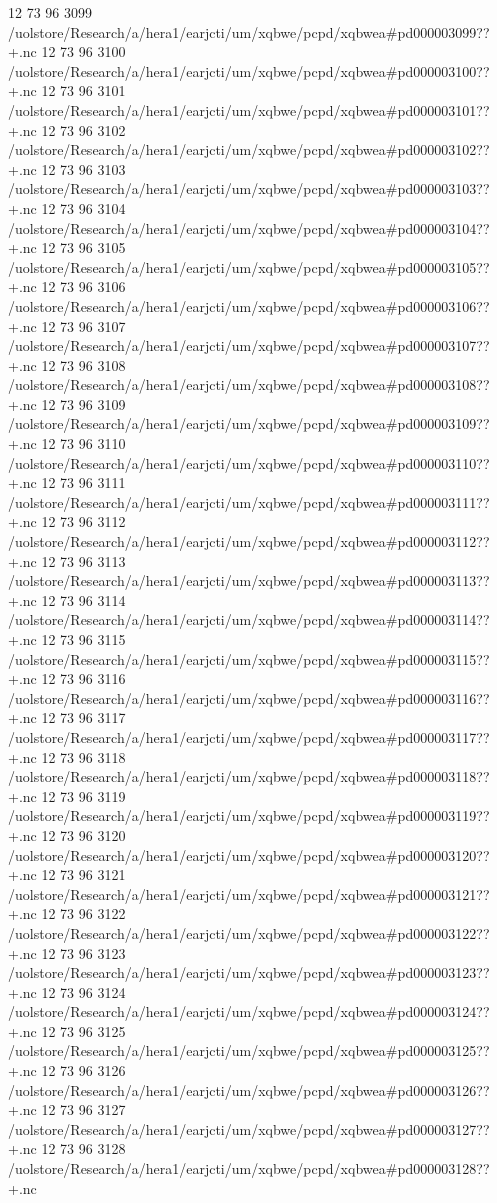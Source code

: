 12 73 96
3099
/uolstore/Research/a/hera1/earjcti/um/xqbwe/pcpd/xqbwea#pd000003099??+.nc
12 73 96
3100
/uolstore/Research/a/hera1/earjcti/um/xqbwe/pcpd/xqbwea#pd000003100??+.nc
12 73 96
3101
/uolstore/Research/a/hera1/earjcti/um/xqbwe/pcpd/xqbwea#pd000003101??+.nc
12 73 96
3102
/uolstore/Research/a/hera1/earjcti/um/xqbwe/pcpd/xqbwea#pd000003102??+.nc
12 73 96
3103
/uolstore/Research/a/hera1/earjcti/um/xqbwe/pcpd/xqbwea#pd000003103??+.nc
12 73 96
3104
/uolstore/Research/a/hera1/earjcti/um/xqbwe/pcpd/xqbwea#pd000003104??+.nc
12 73 96
3105
/uolstore/Research/a/hera1/earjcti/um/xqbwe/pcpd/xqbwea#pd000003105??+.nc
12 73 96
3106
/uolstore/Research/a/hera1/earjcti/um/xqbwe/pcpd/xqbwea#pd000003106??+.nc
12 73 96
3107
/uolstore/Research/a/hera1/earjcti/um/xqbwe/pcpd/xqbwea#pd000003107??+.nc
12 73 96
3108
/uolstore/Research/a/hera1/earjcti/um/xqbwe/pcpd/xqbwea#pd000003108??+.nc
12 73 96
3109
/uolstore/Research/a/hera1/earjcti/um/xqbwe/pcpd/xqbwea#pd000003109??+.nc
12 73 96
3110
/uolstore/Research/a/hera1/earjcti/um/xqbwe/pcpd/xqbwea#pd000003110??+.nc
12 73 96
3111
/uolstore/Research/a/hera1/earjcti/um/xqbwe/pcpd/xqbwea#pd000003111??+.nc
12 73 96
3112
/uolstore/Research/a/hera1/earjcti/um/xqbwe/pcpd/xqbwea#pd000003112??+.nc
12 73 96
3113
/uolstore/Research/a/hera1/earjcti/um/xqbwe/pcpd/xqbwea#pd000003113??+.nc
12 73 96
3114
/uolstore/Research/a/hera1/earjcti/um/xqbwe/pcpd/xqbwea#pd000003114??+.nc
12 73 96
3115
/uolstore/Research/a/hera1/earjcti/um/xqbwe/pcpd/xqbwea#pd000003115??+.nc
12 73 96
3116
/uolstore/Research/a/hera1/earjcti/um/xqbwe/pcpd/xqbwea#pd000003116??+.nc
12 73 96
3117
/uolstore/Research/a/hera1/earjcti/um/xqbwe/pcpd/xqbwea#pd000003117??+.nc
12 73 96
3118
/uolstore/Research/a/hera1/earjcti/um/xqbwe/pcpd/xqbwea#pd000003118??+.nc
12 73 96
3119
/uolstore/Research/a/hera1/earjcti/um/xqbwe/pcpd/xqbwea#pd000003119??+.nc
12 73 96
3120
/uolstore/Research/a/hera1/earjcti/um/xqbwe/pcpd/xqbwea#pd000003120??+.nc
12 73 96
3121
/uolstore/Research/a/hera1/earjcti/um/xqbwe/pcpd/xqbwea#pd000003121??+.nc
12 73 96
3122
/uolstore/Research/a/hera1/earjcti/um/xqbwe/pcpd/xqbwea#pd000003122??+.nc
12 73 96
3123
/uolstore/Research/a/hera1/earjcti/um/xqbwe/pcpd/xqbwea#pd000003123??+.nc
12 73 96
3124
/uolstore/Research/a/hera1/earjcti/um/xqbwe/pcpd/xqbwea#pd000003124??+.nc
12 73 96
3125
/uolstore/Research/a/hera1/earjcti/um/xqbwe/pcpd/xqbwea#pd000003125??+.nc
12 73 96
3126
/uolstore/Research/a/hera1/earjcti/um/xqbwe/pcpd/xqbwea#pd000003126??+.nc
12 73 96
3127
/uolstore/Research/a/hera1/earjcti/um/xqbwe/pcpd/xqbwea#pd000003127??+.nc
12 73 96
3128
/uolstore/Research/a/hera1/earjcti/um/xqbwe/pcpd/xqbwea#pd000003128??+.nc
